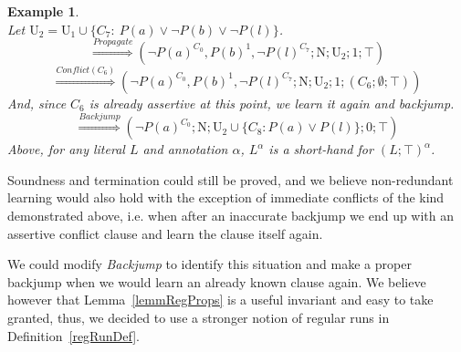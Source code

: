 \documentclass[a4paper]{article}
\newtheorem{example}[defi]{Example}
\newcommand\exClauseNo[1]{C_{#1}} \newcommand{\rst}[1]{|_{#1}}
\begin{document}
\begin{example}
\[\]
Let $\text{U}_2 =  \text{U}_1 \cup \{\exClauseNo{7}:~P(a) \lor \neg P(b) \lor \neg P(l)\}$.
\[
\stackrel{Propagate}{\Rightarrow}
(\neg P(a)^{\exClauseNo{0}}, P(b)^1, \neg P(l)^{\exClauseNo{7}}; \text{N}; \text{U}_2; 1; \top)
\]
\[
\stackrel{Conflict(\exClauseNo{6})}{\Rightarrow}
(\neg P(a)^{\exClauseNo{0}}, P(b)^1, \neg P(l)^{\exClauseNo{7}}; \text{N}; \text{U}_2; 1; (\exClauseNo{6}; \emptyset; \top))
\]
And, since $\exClauseNo{6}$ is already assertive at this point, we learn it again and backjump.
\[
\stackrel{Backjump}{\Rightarrow}
(\neg P(a)^{\exClauseNo{0}}; \text{N}; \text{U}_2 \cup \{\exClauseNo{8}: P(a) \lor P(l)\}; 0; \top)
\]
Above, for any literal $L$ and annotation $\alpha$, $L^\alpha$ is a short-hand for $(L; \top)^\alpha$.
\end{example}
Soundness and termination could still be proved, and we believe non-redundant learning would also hold
with the exception of immediate conflicts of the kind demonstrated above, i.e. when after an inaccurate 
backjump we end up with an assertive conflict clause and learn the clause itself again.

We could modify \emph{Backjump} to identify this situation and make a proper backjump when we 
would learn an already known clause again.
We believe however that Lemma~\ref{lemmRegProps} is a useful invariant and easy to take granted, thus, we 
decided to use a stronger notion of regular runs in Definition~\ref{regRunDef}.
\end{document}

